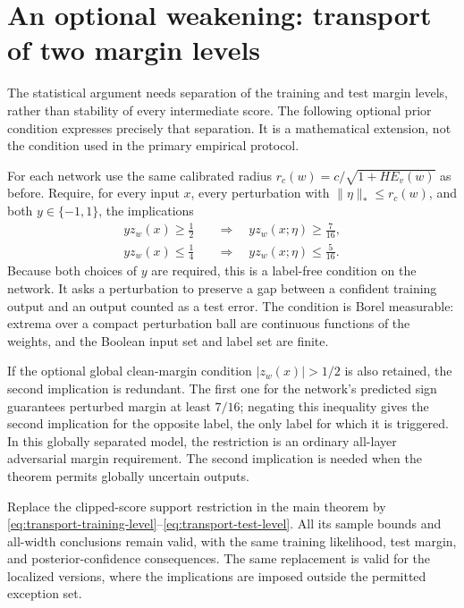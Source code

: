 \section{An optional weakening: transport of two margin levels}
\label{sec:two-margin-transport}

The statistical argument needs separation of the training and test
margin levels, rather than stability of every intermediate score.
The following optional prior condition expresses precisely that
separation. It is a mathematical extension, not the condition used in
the primary empirical protocol.

For each network use the same calibrated radius
$r_c(w)=c/\sqrt{1+H E_v(w)}$ as before. Require, for every input $x$,
every perturbation with $\|\eta\|_*\le r_c(w)$, and both
$y\in\{-1,1\}$, the implications
\begin{align}
 yz_w(x)\ge\tfrac12
 &\quad\Longrightarrow\quad yz_w(x;\eta)\ge\tfrac7{16},
 \label{eq:transport-training-level}\\
 yz_w(x)\le\tfrac14
 &\quad\Longrightarrow\quad yz_w(x;\eta)\le\tfrac5{16}.
 \label{eq:transport-test-level}
\end{align}
Because both choices of $y$ are required, this is a label-free condition
on the network. It asks a perturbation to preserve a gap between a
confident training output and an output counted as a test error.
The condition is Borel measurable: extrema over a compact perturbation
ball are continuous functions of the weights, and the Boolean input
set and label set are finite.

If the optional global clean-margin condition $|z_w(x)|>1/2$ is
also retained, the second implication is redundant. The first one
for the network's predicted sign guarantees perturbed margin at least
$7/16$; negating this inequality gives the second implication for the
opposite label, the only label for which it is triggered. In this
globally separated model, the restriction is an ordinary all-layer
adversarial margin requirement. The second implication is needed when
the theorem permits globally uncertain outputs.

\begin{proposition}
\label{prop:two-margin-transport}
Replace the clipped-score support restriction in the main theorem by
\eqref{eq:transport-training-level}--\eqref{eq:transport-test-level}.
All its sample bounds and all-width conclusions remain valid, with the
same training likelihood, test margin, and posterior-confidence
consequences. The same replacement is valid for the localized versions,
where the implications are imposed outside the permitted exception set.
\end{proposition}

